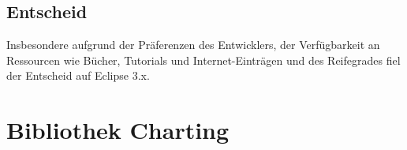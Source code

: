 \subsection{Entscheid}\label{rcp_entscheid}
Insbesondere aufgrund der Präferenzen des Entwicklers, der Verfügbarkeit an Ressourcen wie Bücher, Tutorials und Internet-Einträgen und des Reifegrades fiel der Entscheid auf Eclipse 3.x. 


\section{Bibliothek Charting}\label{library_charting}



